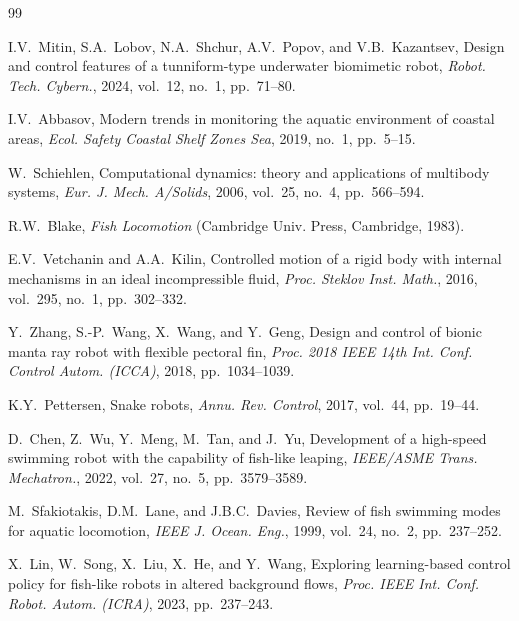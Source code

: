 \documentclass[12pt]{revtex4}
\begin{document}
\makeatletter
\renewcommand{\bibsection}{%
  \let\@hangfroms@section\@hang@froms
  \section*{REFERENCES}%
  \@nobreaktrue
}
\makeatother
\begin{thebibliography}{99}

I.V.~Mitin, S.A.~Lobov, N.A.~Shchur, A.V.~Popov, and
V.B.~Kazantsev, Design and control features of a tunniform-type
underwater biomimetic robot, {\it Robot. Tech. Cybern.},
2024, vol.~12, no.~1, pp.~71--80.

I.V.~Abbasov, Modern trends in monitoring the aquatic environment
of coastal areas, {\it Ecol. Safety Coastal Shelf Zones Sea},
2019, no.~1, pp.~5--15.

W.~Schiehlen, Computational dynamics: theory and applications of
multibody systems, {\it Eur. J. Mech. A/Solids}, 2006, vol.~25,
no.~4, pp.~566--594.

R.W.~Blake, {\it Fish Locomotion} (Cambridge Univ. Press,
Cambridge, 1983).

E.V.~Vetchanin and A.A.~Kilin, Controlled motion of a rigid body
with internal mechanisms in an ideal incompressible fluid,
{\it Proc. Steklov Inst. Math.}, 2016, vol.~295, no.~1,
pp.~302--332.

Y.~Zhang, S.-P.~Wang, X.~Wang, and Y.~Geng, Design and control
of bionic manta ray robot with flexible pectoral fin, {\it Proc.
2018 IEEE 14th Int. Conf. Control Autom. (ICCA)}, 2018,
pp.~1034--1039.

K.Y.~Pettersen, Snake robots, {\it Annu. Rev. Control}, 2017,
vol.~44, pp.~19--44.

D.~Chen, Z.~Wu, Y.~Meng, M.~Tan, and J.~Yu, Development of a
high-speed swimming robot with the capability of fish-like
leaping, {\it IEEE/ASME Trans. Mechatron.}, 2022, vol.~27,
no.~5, pp.~3579--3589.

M.~Sfakiotakis, D.M.~Lane, and J.B.C.~Davies, Review of fish
swimming modes for aquatic locomotion, {\it IEEE J. Ocean. Eng.},
1999, vol.~24, no.~2, pp.~237--252.

X.~Lin, W.~Song, X.~Liu, X.~He, and Y.~Wang, Exploring
learning-based control policy for fish-like robots in altered
background flows, {\it Proc. IEEE Int. Conf. Robot. Autom.
(ICRA)}, 2023, pp.~237--243.


\end{thebibliography}
\end{document}

